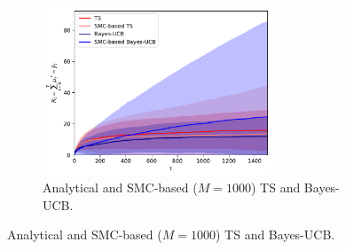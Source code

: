 \begin{figure}[!h]
	\centering
	\begin{subfigure}[b]{\textwidth}
		\centering
		\includegraphics[width=0.75\textwidth]{./fods_figs/static/bernoulli/A5/theta0.1_0.5_0.6_0.7_0.9_M1000_cumulative_regret}
		\caption{Analytical and SMC-based ($M=1000$) TS and Bayes-UCB.}
	\end{subfigure}
	

\end{figure}
